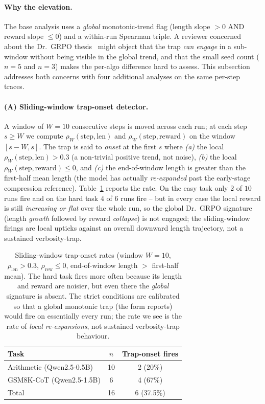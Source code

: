 \paragraph{Why the elevation.}
The base analysis uses a \emph{global} monotonic-trend flag
(length slope $>0$ AND reward slope $\le 0$) and a within-run
Spearman triple. A reviewer concerned about the
Dr.~GRPO thesis~\cite{tong2025drgrpo} might object that the trap
\emph{can engage} in a sub-window without being visible in the
global trend, and that the small seed count ($n{=}5$ and $n{=}3$)
makes the per-algo difference hard to assess. This subsection
addresses both concerns with four additional analyses on the same
per-step traces.

\paragraph{(A) Sliding-window trap-onset detector.}
A window of $W{=}10$ consecutive steps is moved across each run;
at each step $s\ge W$ we compute $\rho_W(\text{step},\text{len})$
and $\rho_W(\text{step},\text{reward})$ on the window $[s-W,s]$.
The trap is said to \emph{onset} at the first $s$ where
\emph{(a)} the local $\rho_W(\text{step},\text{len})>0.3$ (a
non-trivial positive trend, not noise), \emph{(b)} the local
$\rho_W(\text{step},\text{reward})\le 0$, and \emph{(c)} the
end-of-window length is greater than the first-half mean length
(the model has actually \emph{re-expanded} past the early-stage
compression reference). Table~\ref{tab:length-bias-trap-rate}
reports the rate. On the easy task only $2$ of $10$ runs fire and
on the hard task $4$ of $6$ runs fire -- but in every case the
local reward is still \emph{increasing or flat} over the whole
run, so the global Dr.~GRPO signature (length \emph{growth}
followed by reward \emph{collapse}) is not engaged; the
sliding-window firings are local upticks against an overall
downward length trajectory, not a sustained verbosity-trap.

\begin{table}[htbp]
\centering
\small
\begin{tabular}{lcc}
\toprule
Task & $n$ & Trap-onset fires \\
\midrule
Arithmetic (Qwen2.5-0.5B)   & 10 & 2 (20\%) \\
GSM8K-CoT (Qwen2.5-1.5B)   & 6  & 4 (67\%) \\
\midrule
Total & 16 & 6 (37.5\%) \\
\bottomrule
\end{tabular}
\caption{Sliding-window trap-onset rates (window $W{=}10$,
$\rho_\text{len}>0.3$, $\rho_\text{rew}\le 0$, end-of-window
length $>$ first-half mean). The hard task fires more often
because its length and reward are noisier, but even there the
\emph{global} signature is absent. The strict conditions are
calibrated so that a global monotonic trap (the form
\cite{tong2025drgrpo} reports) would fire on essentially every
run; the rate we see is the rate of \emph{local re-expansions},
not sustained verbosity-trap behaviour.}
\label{tab:length-bias-trap-rate}
\end{table}

